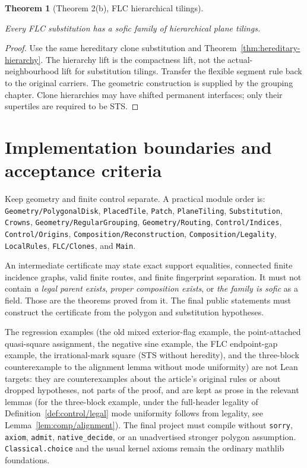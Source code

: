 \documentclass[11pt,a4paper]{article}
\newtheorem{theorem}[definition]{Theorem}
\theoremstyle{remark}
\newcommand{\lean}[1]{}
\newcommand{\uses}[1]{}
\begin{document}
\begin{theorem}[Theorem 2(b), FLC hierarchical tilings]\label{thm:flc-hierarchy}
\lean{Tilings.Main.flc_hierarchy_sofic}
\uses{def:flc,def:sofic}
Every FLC substitution has a sofic family of hierarchical plane tilings.
\end{theorem}
\begin{proof}
\uses{lem:finite-neighbourhoods,lem:clone-sts,lem:clone-hierarchy-lift,thm:hereditary-hierarchy,lem:segment-rules}
Use the same hereditary clone substitution and Theorem~\ref{thm:hereditary-hierarchy}.
The hierarchy lift is the compactness lift, not the actual-neighbourhood
lift for substitution tilings. Transfer the flexible segment rule back to
the original carriers. The geometric construction is supplied by the grouping chapter.
Clone hierarchies may have shifted permanent interfaces; only their
supertiles are required to be STS.
\end{proof}

\section{Implementation boundaries and acceptance criteria}

Keep geometry and finite control separate. A practical module order is:
\texttt{Geometry/PolygonalDisk}, \texttt{PlacedTile}, \texttt{Patch},
\texttt{PlaneTiling}, \texttt{Substitution}, \texttt{Crowns},
\texttt{Geometry/RegularGrouping}, \texttt{Geometry/Routing},
\texttt{Control/Indices}, \texttt{Control/Origins},
\texttt{Composition/Reconstruction}, \texttt{Composition/Legality},
\texttt{LocalRules}, \texttt{FLC/Clones}, and \texttt{Main}.

An intermediate certificate may state exact support equalities, connected
finite incidence graphs, valid finite routes, and finite fingerprint
separation. It must not contain \emph{a legal parent exists},
\emph{proper composition exists}, or \emph{the family is sofic} as a field.
Those are the theorems proved from it. The final public statements must
construct the certificate from the polygon and substitution hypotheses.

The regression examples (the old mixed exterior-flag example, the
point-attached quasi-square assignment, the negative sine example, the FLC
endpoint-gap example, the irrational-mark square (STS without heredity), and
the three-block counterexample to the alignment lemma without mode
uniformity) are not Lean targets: they are counterexamples about the
article's original rules or about dropped hypotheses, not parts of the proof,
and are kept as prose in the relevant lemmas (for the three-block example,
under the full-header legality of Definition~\ref{def:control/legal} mode
uniformity follows from legality, see Lemma~\ref{lem:comp/alignment}).
The final project must compile without
\texttt{sorry}, \texttt{axiom}, \texttt{admit}, \texttt{native\_decide}, or
an unadvertised stronger polygon assumption. \texttt{Classical.choice}
and the usual kernel axioms remain the ordinary mathlib foundations.
\end{document}
